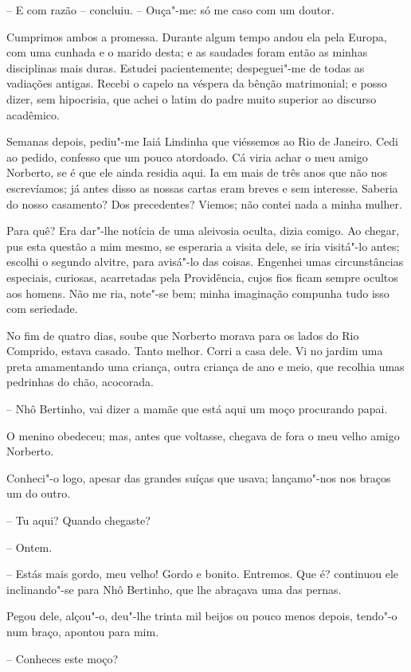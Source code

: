 -- E com razão -- concluiu. -- Ouça"-me: só me caso com um doutor.

Cumprimos ambos a promessa. Durante algum tempo andou ela pela Europa,
com uma cunhada e o marido desta; e as saudades foram então as minhas
disciplinas mais duras. Estudei pacientemente; despeguei"-me de todas as
vadiações antigas. Recebi o capelo na véspera da bênção matrimonial; e
posso dizer, sem hipocrisia, que achei o latim do padre muito superior
ao discurso acadêmico.

Semanas depois, pediu"-me Iaiá Lindinha que viéssemos ao Rio de Janeiro.
Cedi ao pedido, confesso que um pouco atordoado. Cá viria achar o meu
amigo Norberto, se é que ele ainda residia aqui. Ia em mais de três anos
que não nos escrevíamos; já antes disso as nossas cartas eram breves e
sem interesse. Saberia do nosso casamento? Dos precedentes? Viemos; não
contei nada a minha mulher.

Para quê? Era dar"-lhe notícia de uma aleivosia oculta, dizia comigo. Ao
chegar, pus esta questão a mim mesmo, se esperaria a visita dele, se
iria visitá"-lo antes; escolhi o segundo alvitre, para avisá"-lo das
coisas. Engenhei umas circunstâncias especiais, curiosas, acarretadas
pela Providência, cujos fios ficam sempre ocultos aos homens. Não me
ria, note"-se bem; minha imaginação compunha tudo isso com seriedade.

No fim de quatro dias, soube que Norberto morava para os lados do Rio
Comprido, estava casado. Tanto melhor. Corri a casa dele. Vi no jardim
uma preta amamentando uma criança, outra criança de ano e meio, que
recolhia umas pedrinhas do chão, acocorada.

-- Nhô Bertinho, vai dizer a mamãe que está aqui um moço procurando
papai.

O menino obedeceu; mas, antes que voltasse, chegava de fora o meu velho
amigo Norberto.

Conheci"-o logo, apesar das grandes suíças que usava; lançamo"-nos nos
braços um do outro.

-- Tu aqui? Quando chegaste?

-- Ontem.

-- Estás mais gordo, meu velho! Gordo e bonito. Entremos. Que é?
continuou ele inclinando"-se para Nhô Bertinho, que lhe abraçava uma das
pernas.

Pegou dele, alçou"-o, deu"-lhe trinta mil beijos ou pouco menos depois,
tendo"-o num braço, apontou para mim.

-- Conheces este moço?

